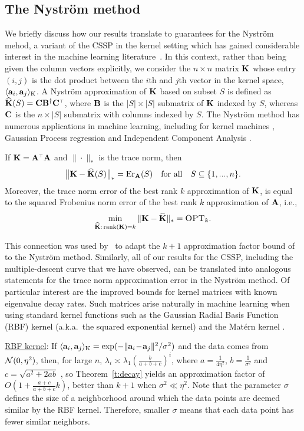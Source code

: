 \documentclass{article}
\begin{document}
  \subsection{The Nystr\"om method}\label{s:nystrom}
  We briefly discuss how our results translate to guarantees for the Nystr\"om
  mehod, a variant of the CSSP in the kernel setting which has
  gained considerable interest in the machine learning literature~\citep{dm_kernel_JRNL,revisiting-nystrom}.
In this context, rather than being given the column vectors
explicitly, we consider the 
$n\times n$ matrix $\mathbf K$ whose entry $(i,j)$ is the dot product
between the $i$th and $j$th vector in the kernel space,
$\langle\mathbf a_i,\mathbf a_j\rangle_\text{K}$. A Nystr\"om approximation of $\mathbf K$ based on subset $S$
is defined as $\Kbh(S) = \C\B^{\dagger}\C^\top$, where $\mathbf B$ is the
$|S|\times |S|$ submatrix of $\mathbf K$ indexed by $S$, whereas $\mathbf C$ is the
$n\times |S|$  submatrix with columns indexed by $S$. The Nystr\"om
method has numerous applications in machine learning, including for
kernel machines \citep{Williams01Nystrom}, Gaussian Process regression 
\citep{sparse-variational-gp} and Independent Component Analysis
\citep{Bach2003}. 
\begin{remark}
  If $\K=\A^\top\A$ and $\|\cdot\|_*$ is the trace norm, then
  \begin{align*}
    \big\|\mathbf K-{\widehat{\mathbf K}}(S)\big\|_* = \mathrm{Er}_{\mathbf A}(S) \quad \text{for all}\quad
    S\subseteq\{1,...,n\}.
  \end{align*}
Moreover, the trace norm error of the best rank $k$ approximation of
$\mathbf K$, 
is equal to the squared Frobenius norm error of the 
best rank $k$ approximation of $\mathbf A$, i.e.,
\[\min_{{\widehat{\mathbf K}}:\,\mathrm{rank}(\mathbf K)=k}\|\mathbf K-{\widehat{\mathbf K}}\|_* = {\textsc{OPT}_k}.\]
\end{remark}
\vspace{-2mm}
This connection was used by~\citet{belabbas-wolfe09} to adapt the
$k+1$ approximation factor bound 
of~\citet{pca-volume-sampling} to the Nystr\"om method.   
Similarly, all of our results for the CSSP, including the
multiple-descent curve that we have observed, can be translated into analogous
statements for the trace norm approximation error in the Nystr\"om
method. Of particular interest 
are the improved bounds for kernel matrices with known eigenvalue
decay rates. Such matrices arise naturally in machine learning when
using standard kernel functions such as the Gaussian Radial Basis Function
(RBF) kernel (a.k.a.~the squared exponential kernel) and the
Mat\'ern kernel \citep{sparse-variational-gp}.

\underline{RBF kernel}: If
$\langle\mathbf a_i,\mathbf a_j\rangle_\text{K}=\exp(-\|\mathbf a_i\!-\!\mathbf a_j\|^2/\sigma^2)$ 
and the data comes from $\mathcal{N}(0,\eta^2)$, then,
  for large $n$,
  $\lambda_i\!\asymp\!\lambda_1(\frac{b}{a+b+c})^i$, where
  $a=\frac1{4\eta^2}$, $b=\frac1{\sigma^2}$ and $c=\sqrt{a^2\!+\!2ab}$
  \citep{Santa97gaussianregression},
  so Theorem~\ref{t:decay} yields an approximation factor of
  $O(1\!+\!\frac{a+c}{a+b+c}k)$, better than $k\!+\!1$ when
  $\sigma^2\ll\eta^2$. Note that the parameter $\sigma$ defines the
  size of a neighborhood around which the data points are deemed
  similar by the RBF kernel. Therefore, smaller $\sigma$ means that
  each data point has fewer similar neighbors.
\end{document}
